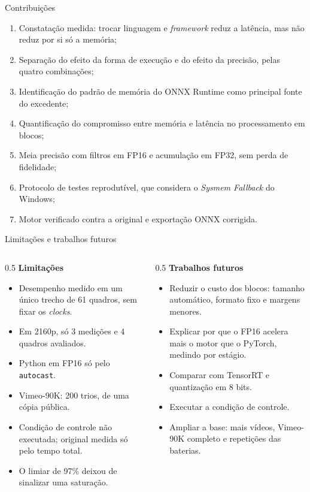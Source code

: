 \documentclass[
    aspectratio=169,
    12pt,
    brazil,
    xcolor=table
]{beamer}
\begin{document}
\begin{frame}{Contribuições}
  \small
  \begin{enumerate}
    \item Constatação medida: trocar linguagem e \textit{framework} reduz a latência, mas não reduz por si só a memória;
    \item Separação do efeito da forma de execução e do efeito da precisão, pelas quatro combinações;
    \item Identificação do padrão de memória do ONNX Runtime como principal fonte do excedente;
    \item Quantificação do compromisso entre memória e latência no processamento em blocos;
    \item Meia precisão com filtros em FP16 e acumulação em FP32, sem perda de fidelidade;
    \item Protocolo de testes reprodutível, que considera o \textit{Sysmem Fallback} do Windows;
    \item Motor verificado contra a original e exportação ONNX corrigida.
  \end{enumerate}
\end{frame}

\begin{frame}{Limitações e trabalhos futuros}
  \footnotesize
  \begin{columns}[T]
    \begin{column}{0.5\textwidth}
      \textbf{Limitações}
      \begin{itemize}
        \item Desempenho medido em um único trecho de 61 quadros, sem fixar os \textit{clocks}.
        \item Em 2160p, só 3 medições e 4 quadros avaliados.
        \item Python em FP16 só pelo \texttt{autocast}.
        \item Vimeo-90K: 200 trios, de uma cópia pública.
        \item Condição de controle não executada; original medida só pelo tempo total.
        \item O limiar de 97\% deixou de sinalizar uma saturação.
      \end{itemize}
    \end{column}
    \begin{column}{0.5\textwidth}
      \textbf{Trabalhos futuros}
      \begin{itemize}
        \item Reduzir o custo dos blocos: tamanho automático, formato fixo e margens menores.
        \item Explicar por que o FP16 acelera mais o motor que o PyTorch, medindo por estágio.
        \item Comparar com TensorRT e quantização em 8 bits.
        \item Executar a condição de controle.
        \item Ampliar a base: mais vídeos, Vimeo-90K completo e repetições das baterias.
      \end{itemize}
    \end{column}
  \end{columns}
\end{frame}
\end{document}
